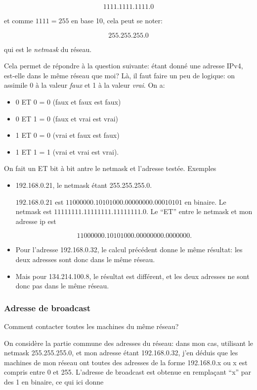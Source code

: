 $$ 1111.1111.1111.0$$

et comme $1111 = 255$ en base 10, cela peut se noter:

$$255.255.255.0$$

qui est le \emph{netmask} du réseau.

Cela permet de répondre à la question suivante: étant donné une
adresse IPv4, est-elle dans le même réseau que moi? Là, il faut faire
un peu de logique: on assimile 0 à la valeur \emph{faux} et 1 à la
valeur \emph{vrai}. On a:

\begin{itemize}
\item 0 ET 0 = 0 (faux et faux est faux)
\item 0 ET 1 = 0 (faux et vrai est vrai)
\item 1 ET 0 = 0 (vrai et faux est faux)
\item 1 ET 1 = 1 (vrai et vrai est vrai).
\end{itemize}
 On fait un \og ET\fg{} bit à bit antre le netmask et l'adresse
 testée. Exemples
 \begin{itemize}
 \item 192.168.0.21, le netmask étant 255.255.255.0.

   $192.168.0.21$ est $11000000.10101000.00000000.00010101$ en
   binaire. Le netmask est $11111111.11111111.11111111.0$. Le ``ET''
   entre le netmask et mon adresse ip est
   
   $$11000000.10101000.00000000.0000000.$$
   
 \item Pour l'adresse 192.168.0.32, le calcul précédent donne le même
   résultat: les deux adresses sont donc dans le même réseau.
 \item Mais pour 134.214.100.8, le résultat est différent, et les deux
   adresses ne sont donc pas dans le même réseau.
\end{itemize}
   
 

\subsubsection{Adresse de broadcast}
Comment contacter toutes les machines du même réseau?

On considère la partie commune des adresses du réseau: dans mon cas,
utilisant le netmask 255.255.255.0, et mon adresse étant 192.168.0.32,
j'en déduis que les machines de mon réseau ont toutes des adresses de
la forme 192.168.0.x ou x est compris entre 0 et 255. L'adresse de
broadcast est obtenue en remplaçant ``x'' par des 1 en binaire, ce qui
ici donne


